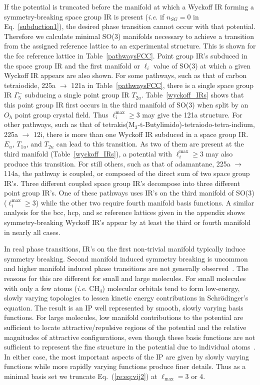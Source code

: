 \documentclass[preprint]{revtex4}
\begin{document}
If the potential is truncated before the manifold at which a Wyckoff
IR forming a symmetry-breaking space group IR is present
(\emph{i.e.} if $n_{SG}=0$ in Eq.\ \ref{subduction1}), the desired
phase transition cannot occur with that potential. Therefore we
calculate minimal SO(3) manifolds necessary to achieve a transition
from the assigned reference lattice to an experimental structure.
This is shown for the fcc reference lattice in Table~\ref{pathwaysFCC}.  Point group IR's subduced
in the space group IR and the first
manifold or $\ell_i$ value of SO(3) at which a given Wyckoff IR
appears are also shown. For some pathways, such as that of carbon tetraiodide, 225a
$\rightarrow$ 121a in Table~\ref{pathwaysFCC}, there is a single
space group IR $\Gamma_5^-$ subducing a single point group IR
$T_{2u}$. Table~\ref{wyckoff_IRs} shows that this point group IR
first occurs in the third manifold of SO(3) when split by an $O_h$
point group crystal field.  Thus $\ell_i^{\mathrm{max}}\geq 3$ may
give the 121a structure. For other pathways, such as that of tetrakis(M$_3$-t-Butylimido)-tetraiodo-tetra-indium, 225a
$\rightarrow$ 12i, there is more than
one Wyckoff IR subduced in a space group IR. $E_u$, $T_{1u}$, and
$T_{2u}$ can lead to this transition. As two of them are present at the
third manifold (Table~\ref{wyckoff_IRs}), a potential with $\ell_i^{\mathrm{max}}\geq 3$ may also produce this transition. For still others, such as that of adamantane,
225a $\rightarrow$ 114a, the pathway is
coupled, or composed of the direct sum of two space group IR's.
Three different coupled space group IR's decompose into three
different point group IR's. One of these pathways uses IR's on the
third manifold of SO(3) ($\ell^{\mathrm{max}}_i\geq 3$) while the
other two require fourth manifold basis functions. A similar analysis
for the bcc, hcp, and sc reference
lattices given in the appendix shows symmetry-breaking
Wyckoff IR's appear by at least the third or fourth manifold in
nearly all cases.

In real phase transitions, IR's on the first non-trivial manifold
typically induce symmetry breaking. Second manifold induced symmetry
breaking is uncommon and higher manifold induced phase transitions
are not generally observed~\cite{LyndenBell94}. The reasons for this
are different for small and large molecules. For small molecules
with only a few atoms (\emph{i.e.} CH$_4$) molecular orbitals tend
to form low-energy, slowly varying topologies to lessen kinetic
energy contributions in Schr\"{o}dinger's equation. The result is an
IP well represented by smooth, slowly varying basis functions. For
large molecules, low manifold contributions to the potential are
sufficient to locate attractive/repulsive regions of the potential
and the relative magnitudes of attractive configurations, even
though these basis functions are not sufficient to represent the
fine structure in the potential due to individual
atoms~\cite{Hloucha01}. In either case, the most important aspects
of the IP are given by slowly varying functions  while more rapidly
varying functions produce finer details. Thus as a minimal basis set
we truncate Eq.~(\ref{re:eq:vij2}) at $\ell_{\mathrm{max}}=3$ or 4.
\end{document}
